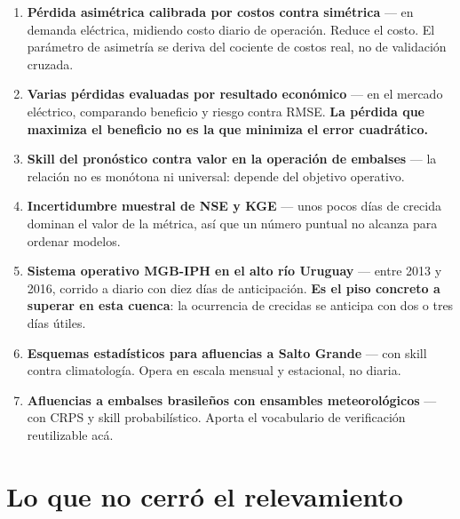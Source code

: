 \documentclass{../comun/tesisuba}
\newcommand{\entrada}[2]{\item \textbf{#1} --- #2}
\begin{document}
\begin{enumerate}[leftmargin=*, itemsep=4pt]
\entrada{Pérdida asimétrica calibrada por costos contra simétrica}{en demanda eléctrica, midiendo
costo diario de operación. Reduce el costo. El parámetro de asimetría se deriva del cociente de
costos real, no de validación cruzada. \citet{wu-2021-asymmetric-svr-load-forecasting}}

\entrada{Varias pérdidas evaluadas por resultado económico}{en el mercado eléctrico, comparando
beneficio y riesgo contra RMSE. \textbf{La pérdida que maximiza el beneficio no es la que minimiza
el error cuadrático.} \citet{serafin-weron-2025-loss-functions-trading}}

\entrada{Skill del pronóstico contra valor en la operación de embalses}{la relación no es monótona
ni universal: depende del objetivo operativo.
\citet{turner-2017-forecast-skill-value-reservoir}}

\entrada{Incertidumbre muestral de NSE y KGE}{unos pocos días de crecida dominan el valor de la
métrica, así que un número puntual no alcanza para ordenar modelos.
\citet{clark-2021-abuse-performance-metrics}}

\entrada{Sistema operativo MGB-IPH en el alto río Uruguay}{entre 2013 y 2016, corrido a diario con
diez días de anticipación. \textbf{Es el piso concreto a superar en esta cuenca}: la ocurrencia de
crecidas se anticipa con dos o tres días útiles. \citet{fan-2017-uruguai-operacional}}

\entrada{Esquemas estadísticos para afluencias a Salto Grande}{con skill contra climatología.
Opera en escala mensual y estacional, no diaria. \citet{talento-2013-salto-grande}}

\entrada{Afluencias a embalses brasileños con ensambles meteorológicos}{con CRPS y skill
probabilístico. Aporta el vocabulario de verificación reutilizable acá.
\citet{fan-2015-tigge-embalses}}

\end{enumerate}

\newpage

\section*{Lo que no cerró el relevamiento}
\end{document}
